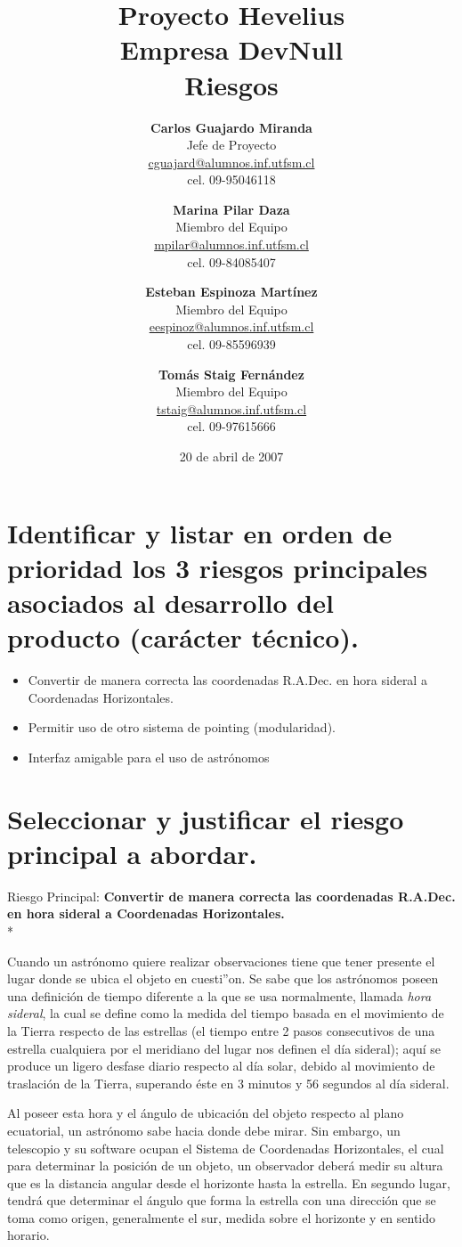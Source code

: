 \documentclass[letterpaper,spanish,10pt]{article}
\title{{\Huge \bf Proyecto Hevelius} \\ {\Large Empresa DevNull} \\ {\small Riesgos}}
\author{
{\bf Carlos Guajardo Miranda} \\ Jefe de Proyecto \\ \url{cguajard@alumnos.inf.utfsm.cl} \\ cel. 09-95046118 
\and
{\bf Marina Pilar Daza} \\ Miembro del Equipo \\ \url{mpilar@alumnos.inf.utfsm.cl} \\ cel. 09-84085407
\and
{\bf Esteban Espinoza Mart\'inez} \\ Miembro del Equipo \\ \url{eespinoz@alumnos.inf.utfsm.cl} \\ cel. 09-85596939
\and
{\bf Tom\'as Staig Fern\'andez} \\ Miembro del Equipo \\ \url{tstaig@alumnos.inf.utfsm.cl} \\ cel. 09-97615666
}
\date{20 de abril de 2007}
\begin{document}
\maketitle


%
%
\newpage

\section{Identificar y listar en orden de prioridad los 3 riesgos principales asociados al desarrollo del producto (carácter técnico).}

\begin{itemize}
	\item Convertir de manera correcta las coordenadas R.A.Dec. en hora sideral a Coordenadas Horizontales.
	\item Permitir uso de otro sistema de pointing (modularidad).
	\item Interfaz amigable para el uso de astr\'onomos
\end{itemize}


\section{Seleccionar y justificar el riesgo principal a abordar.}

Riesgo Principal: \textbf{Convertir de manera correcta las coordenadas R.A.Dec. en hora sideral a Coordenadas Horizontales.}\\*

Cuando un astr\'onomo quiere realizar observaciones tiene que tener presente el lugar donde se ubica el objeto en cuesti''on.
Se sabe que los astr\'onomos poseen una definici\'on de tiempo diferente a la que se usa normalmente, llamada \textit{hora sideral},
la cual se define como la medida del tiempo basada en el movimiento de la Tierra respecto de las estrellas (el tiempo entre 2 
pasos consecutivos de una estrella cualquiera por el meridiano del lugar nos definen el d\'ia sideral); aqu\'i se produce un 
ligero desfase diario respecto al d\'ia solar, debido al movimiento de traslaci\'on de la Tierra, superando \'este en 3 minutos 
y 56 segundos al d\'ia sideral.

Al poseer esta hora y el ángulo de ubicaci\'on del objeto respecto al plano ecuatorial, un astr\'onomo sabe hacia donde debe mirar. 
Sin embargo, un telescopio y su software ocupan el Sistema de Coordenadas Horizontales, el cual para determinar la posici\'on de 
un objeto, un observador deber\'a medir su altura que es la distancia angular desde el horizonte hasta la estrella. En segundo lugar, 
tendrá que determinar el \'angulo que forma la estrella con una direcci\'on que se toma como origen, generalmente el sur, medida 
sobre el horizonte y en sentido horario.
\end{document}

